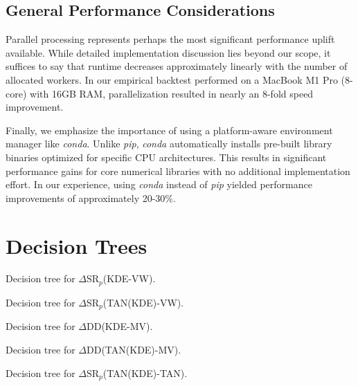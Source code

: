 \subsection{General Performance Considerations}
Parallel processing represents perhaps the most significant performance uplift available. While detailed implementation discussion lies beyond our scope, it suffices to say that runtime decreases approximately linearly with the number of allocated workers. In our empirical backtest performed on a MacBook M1 Pro (8-core) with 16GB RAM, parallelization resulted in nearly an 8-fold speed improvement.

Finally, we emphasize the importance of using a platform-aware environment manager like \textit{conda}. Unlike \textit{pip}, \textit{conda} automatically installs pre-built library binaries optimized for specific CPU architectures. This results in significant performance gains for core numerical libraries with no additional implementation effort. In our experience, using \textit{conda} instead of \textit{pip} yielded performance improvements of approximately 20-30\%.

\section{Decision Trees}
\label{app:decisiontrees}

\begin{table}[H]
  \centering
  
  \caption[CART 1]{Decision tree for $\Delta$SR$_p$(KDE-VW).}
  \label{fig:tree1}
\end{table}
\clearpage

\begin{table}[H]
  \centering
  
  \caption[CART 2]{Decision tree for $\Delta$SR$_p$(TAN(KDE)-VW).}
  \label{fig:tree2}
\end{table}
\clearpage

\begin{table}[H]
  \centering
  
  \caption[CART 3]{Decision tree for $\Delta$DD(KDE-MV).}
  \label{fig:tree3}
\end{table}
\clearpage

\begin{table}[H]
  \centering
  
  \caption[CART 4]{Decision tree for $\Delta$DD(TAN(KDE)-MV).}
  \label{fig:tree4}
\end{table}
\clearpage

\begin{table}[H]
  \centering
  
  \caption[CART 5]{Decision tree for $\Delta$SR$_p$(TAN(KDE)-TAN).}
  \label{fig:tree5}
\end{table}
